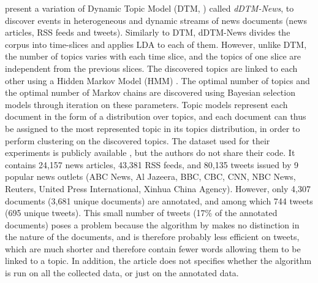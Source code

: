\cite{mele_linking_2017, mele2019event} present a variation of Dynamic Topic Model  (DTM, \citep{blei_dynamic_2006}) called \textit{dDTM-News}, to discover events in heterogeneous and dynamic streams of news documents (news articles, RSS feeds and tweets). Similarly to DTM, dDTM-News divides the corpus into time-slices and applies LDA to each of them. However, unlike DTM, the number of topics varies with each time slice, and the topics of one slice are independent from the previous slices. The discovered topics are linked to each other using a Hidden Markov Model (HMM) \citep{rabiner1989tutorial}. The optimal number of topics and the optimal number of Markov chains are discovered using Bayesian selection models through iteration on these parameters. Topic models represent each document in the form of a distribution over topics, and each document can thus be assigned to the most represented topic in its topics distribution, in order to perform clustering on the discovered topics. The dataset used for their experiments is publicly available \citep{mele2019multi}, but the authors do not share their code. It contains 24,157 news articles, 43,381 RSS feeds, and 80,135 tweets issued by 9 popular news outlets (ABC News, Al Jazeera, BBC, CBC, CNN, NBC News, Reuters, United Press International, Xinhua China Agency). However, only 4,307 documents (3,681 unique documents) are annotated, and among which 744 tweets (695 unique tweets). This small number of tweets (17\% of the annotated documents) poses a problem because the algorithm by \cite{mele_linking_2017, mele2019event} makes no distinction in the nature of the documents, and is therefore probably less efficient on tweets, which are much shorter and therefore contain fewer words allowing them to be linked to a topic.
In addition, the article does not specifies whether the algorithm is run on all the collected data, or just on the annotated data. 

